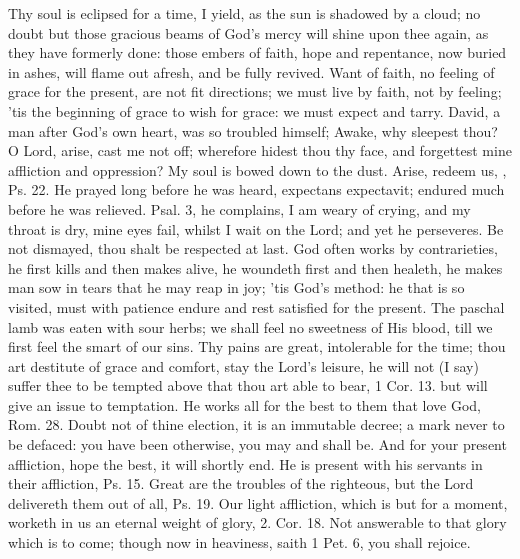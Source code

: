 {Thy soul is eclipsed for a time, I yield, as the sun is shadowed by a
cloud; no doubt but those gracious beams of God's mercy will shine upon
thee again, as they have formerly done: those embers of faith, hope and
repentance, now buried in ashes, will flame out afresh, and be fully
revived. Want of faith, no feeling of grace for the present, are not
fit directions; we must live by faith, not by feeling; 'tis the
beginning of grace to wish for grace: we must expect and tarry. David,
a man after God's own heart, was so troubled himself; Awake, why
sleepest thou? O Lord, arise, cast me not off; wherefore hidest thou
thy face, and forgettest mine affliction and oppression? My soul is
bowed down to the dust. Arise, redeem us, \etc{}, Ps.  22. He prayed
long before he was heard, expectans expectavit; endured much before he
was relieved. Psal.  3, he complains, I am weary of crying, and my
throat is dry, mine eyes fail, whilst I wait on the Lord; and yet he
perseveres. Be not dismayed, thou shalt be respected at last. God often
works by contrarieties, he first kills and then makes alive, he
woundeth first and then healeth, he makes man sow in tears that he may
reap in joy; 'tis God's method: he that is so visited, must with
patience endure and rest satisfied for the present. The paschal lamb
was eaten with sour herbs; we shall feel no sweetness of His blood,
till we first feel the smart of our sins. Thy pains are great,
intolerable for the time; thou art destitute of grace and comfort, stay
the Lord's leisure, he will not (I say) suffer thee to be tempted above
that thou art able to bear, 1 Cor.  13. but will give an issue to
temptation. He works all for the best to them that love God, Rom. 
28. Doubt not of thine election, it is an immutable decree; a mark
never to be defaced: you have been otherwise, you may and shall be. And
for your present affliction, hope the best, it will shortly end. He is
present with his servants in their affliction, Ps.  15. Great are
the troubles of the righteous, but the Lord delivereth them out of all,
Ps.  19. Our light affliction, which is but for a moment, worketh
in us an eternal weight of glory, 2. Cor.  18. Not answerable to
that glory which is to come; though now in heaviness, saith 1 Pet. 
6, you shall rejoice.

}
